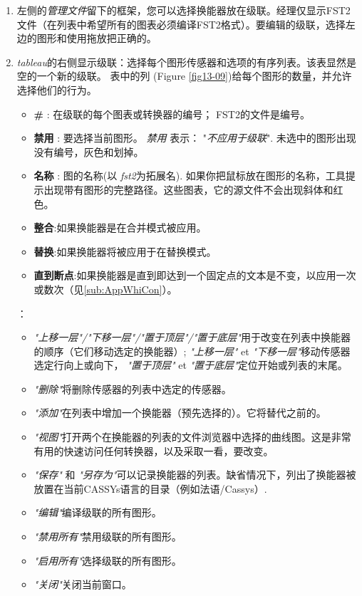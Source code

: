 \begin{enumerate}
	\item 左侧的\textit{管理文件}留下的框架，您可以选择换能器放在级联。经理仅显示FST2文件（在列表中希望所有的图表必须编译FST2格式）。要编辑的级联，选择左边的图形和使用拖放把正确的。	
	\item  \textit{tableau}的右侧显示级联：选择每个图形传感器和选项的有序列表。该表显然是空的一个新的级联。		 
		表中的列 (Figure \ref{fig13-09})给每个图形的数量，并允许选择他们的行为。
	\begin{itemize}
	\item \textbf{\#} : 在级联的每个图表或转换器的编号；
 FST2的文件是编号。
	\item \textbf{禁用} : 要选择当前图形。 \textit{禁用} 表示： "\textit{不应用于级联}".
		未选中的图形出现没有编号，灰色和划掉。	\item \textbf{名称} : 图的名称(以 \emph{fst2}为拓展名). 如果你把鼠标放在图形的名称，工具提示出现带有图形的完整路径。这些图表，它的源文件不会出现斜体和红色。

	\item \textbf{整合}:如果换能器是在合并模式被应用。
	\item \textbf{替换}:如果换能器将被应用于在替换模式。
	\item \textbf{直到断点}:如果换能器是直到即达到一个固定点的文本是不变，以应用一次或数次（见\ref{sub:AppWhiCon}）。
	\end{itemize}
	
	 ：
		\begin{itemize}
		\item \textit{"上移一层"/"下移一层"/"置于顶层"/"置于底层"}用于改变在列表中换能器的顺序（它们移动选定的换能器）; 
		\textit{"上移一层"} et \textit{"下移一层"}移动传感器选定行向上或向下， \textit{"置于顶层"} et \textit{"置于底层"}定位开始或列表的末尾。
		\item \textit{"删除"}将删除传感器的列表中选定的传感器。
		\item \textit{"添加"}在列表中增加一个换能器（预先选择的）。它将替代之前的。
		\item \textit{"视图"}打开两个在换能器的列表的文件浏览器中选择的曲线图。这是非常有用的快速访问任何转换器，以及采取一看，要改变。
		\item \textit{"保存"} 和 \textit{"另存为"}可以记录换能器的列表。缺省情况下，列出了换能器被放置在当前CASSYs语言的目录（例如法语/Cassys）.
		\item \textit{"编辑"}编译级联的所有图形。	
		\item \textit{"禁用所有"}禁用级联的所有图形。	
		\item \textit{"启用所有"}选择级联的所有图形。	
		\item \textit{"关闭"}关闭当前窗口。
		\end{itemize}
\end{enumerate}


